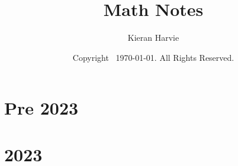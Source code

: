 \documentclass[12pt]{report}
\title{Math Notes}
\date{Copyright \textcopyright\, \today. All Rights Reserved.}
\author{Kieran Harvie}
\begin{document}
\maketitle
\tableofcontents

\chapter{Pre 2023}














\chapter{2023}


























\end{document}
